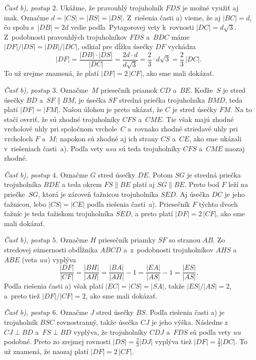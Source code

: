 {\smallskip\noindent
{\it Časť b), postup $2$.}
Ukážme, že pravouhlý trojuholník $FDS$ je možné využiť aj inak.
Označme $d=|CS|=|BS|=|DS|$. Z~riešenia časti a) vieme, že aj $|BC|=d$,
čo spolu s~$|DB|=2d$ vedie podľa~Pytagorovej vety k~rovnosti
$|DC|=d\sqrt{3}$. Z~podobnosti pravouhlých trojuholníkov $FDS$ a~$BDC$
máme $|DF|/|DS|=|DB|/|DC|$, odkiaľ pre dĺžku úsečky $DF$
vychádza
$$
|DF|=\frac{|DB|\cdot|DS|}{|DC|}=
\frac{2d\cdot d}{d\sqrt3}=\frac23\cdot d\sqrt3=\frac23\,|DC|.
$$
To už zrejme znamená, že platí $|DF|=2\,|CF|$, ako sme mali dokázať.

\smallskip\noindent
{\it Časť b), postup $3$.}
Označme~$M$ priesečník priamok $CD$ a~$BE$.
Keďže~$S$ je stred úsečky $BD$ a~$SF\parallel BM$, je úsečka
$SF$ stredná priečka trojuholníka $BMD$, teda platí $|DF|=|FM|$. Našou
úlohou je preto ukázať, že $C$ je stred úsečky $FM$. Na to stačí
overiť, že sú zhodné trojuholníky $CFS$ a~$CME$. Tie však majú zhodné
vrcholové uhly pri spoločnom vrchole~$C$ a~rovnako zhodné
striedavé uhly pri vrcholoch $F$ a~$M$; napokon sú zhodné
aj ich strany $CS$ a~$CE$, ako sme ukázali v~riešeniach časti~a).
Podľa vety $usu$ sú teda trojuholníky $CFS$ a~$CME$ naozaj zhodné.
%

\smallskip\noindent
{\it Časť b), postup $4$.}
Označme $G$ stred úsečky $DE$. Potom $SG$ je stredná priečka trojuholníka
$BDE$ a teda okrem $FS\parallel BE$ platí aj $SG\parallel BE$.
Preto bod $F$ leží na priečke~$SG$, ktorá je zároveň
ťažnicou trojuholníka $SED$. Aj úsečka $DC$ je jeho ťažnicou,
lebo $|CS|=|CE|$ podľa riešenia časti~a). Priesečník $F$ týchto dvoch
ťažníc je teda ťažiskom trojuholníka $SED$, a preto platí
$|DF|=2\,|CF|$, ako sme mali dokázať.
%

\smallskip\noindent
{\it Časť b), postup $5$.}
Označme $H$ priesečník priamky $SF$ so stranou $AB$.
Zo stredovej súmernosti obdĺžnika $ABCD$ a~z~podobnosti
trojuholníkov $AHS$ a~$ABE$ (veta $uu$) vyplýva
$$
\frac{|DF|}{|CF|}=\frac{|BH|}{|AH|}=\frac{|BA|}{|AH|}-1=
\frac{|EA|}{|AS|}-1=\frac{|ES|}{|AS|}.
$$
Podľa riešenia časti a) však platí $|EC|=|CS|=|SA|$, takže
$|ES|/|AS|=2$, a~preto tiež $|DF|/|CF|=2$, ako sme mali
dokázať.
%

\smallskip\noindent
{\it Časť b), postup $6$.}
Označme $J$ stred úsečky $BS$.
Podľa riešenia časti a) je trojuholník $BSC$ rovnostranný,
takže úsečka $CJ$ je jeho výška.
Následne z~$CJ\perp BD$ a~$FS\perp BD$ vyplýva, že trojuholníky
$CDJ$ a~$FDS$ sú podľa vety $uu$ podobné. Preto zo
zrejmej rovnosti $|DS|=\frac23|DJ|$ vyplýva tiež
$|DF|=\frac23|DC|$. To už znamená, že naozaj platí $|DF|=2\,|CF|$.
%

}

